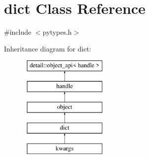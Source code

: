 \hypertarget{classdict}{}\section{dict Class Reference}
\label{classdict}


{\ttfamily \#include $<$pytypes.\+h$>$}

Inheritance diagram for dict\+:\begin{figure}[H]
\begin{center}
\leavevmode
\includegraphics[height=5.000000cm]{classdict}
\end{center}
\end{figure}
